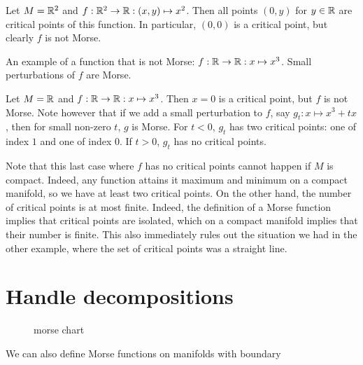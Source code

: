 \begin{eg}
    Let $M = \mathbb{R}^2$ and $f: \mathbb{R}^2 \to  \mathbb{R}: (x, y) \mapsto  x^2$.
    Then all points $(0, y)$ for  $y \in \mathbb{R}$ are critical points of this function.
    In particular, $(0, 0)$ is a critical point, but clearly $f$ is not Morse.
\end{eg}
\begin{marginfigure}
    \centering
    \caption{}
    \label{fig:non-example-of-morse-function}
\end{marginfigure}
\begin{marginfigure}
    \centering
    \caption{An example of a function that is not Morse: $f: \mathbb{R} \to  \mathbb{R}: x \mapsto  x^3$.
        Small perturbations of $f$ are Morse.
    }
    \label{fig:non-examples-of-morse-functions}
\end{marginfigure}
\begin{eg}
    Let $M = \mathbb{R}$ and $f : \mathbb{R} \to  \mathbb{R}: x \mapsto x^3$.
    Then $x = 0$ is a critical point, but $f$ is not Morse.
    Note however that if we add a small perturbation to $f$, say $g_t: x\mapsto x^3+ tx$, then for small non-zero $t$, $g$ is Morse. For $t < 0$, $g_t$  has two critical points: one of index $1$ and one of index $0$.
    If $t > 0$,  $g_t$ has no critical points.
\end{eg}

Note that this last case where $f$ has no critical points cannot happen if $M$ is compact.
Indeed, any function attains it maximum and minimum on a compact manifold, so we have at least two critical points.
On the other hand, the number of critical points is at most finite.
Indeed, the definition of a Morse function implies that critical points are isolated, which on a compact manifold implies that their number is finite.
This also immediately rules out the situation we had in the other example, where the set of critical points was a straight line.

\section{Handle decompositions}

\begin{figure}[H]
    \centering
    \caption{morse chart}
    \label{fig:morse-chart}
\end{figure}


We can also define Morse functions on manifolds with boundary

